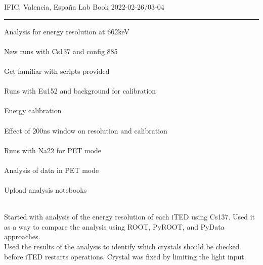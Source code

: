 \begin{center}
  {\Large IFIC, Valencia, España} \hfill {\Large Lab Book} \hfill {\Large 2022-02-26/03-04}\\
  \rule{\textwidth}{1pt}
\end{center}

\begin{minipage}[t][0.45\textheight][t]{0.97\linewidth}
  \begin{minipage}[t]{0.49\textwidth}
    \hspace{10pt}Analysis for energy resolution at 662keV\\~\\
    \hspace{10pt}New runs with Cs137 and config 885\\~\\
    \hspace{10pt}Get familiar with scripts provided\\~\\
    \hspace{10pt}Runs with Eu152 and background for calibration\\~\\
    \hspace{10pt}Energy calibration\\~\\
    \hspace{10pt}Effect of 200ns window on resolution and calibration\\~\\
    \hspace{10pt}Runs with Na22 for PET mode\\~\\
    \hspace{10pt}Analysis of data in PET mode\\~\\
    \hspace{10pt}Upload analysis notebooks\\~\\
  \end{minipage}
  \begin{minipage}[t]{0.49\textwidth}
    \begin{minipage}[t][0.22\textheight][t]{\textwidth}
        Started with analysis of the energy resolution of each iTED using Cs137. Used it as a way to compare the analysis using ROOT, PyROOT, and PyData approaches.\\Used the results of the analysis to identify which crystals should be checked before iTED restarts operations. Crystal was fixed by limiting the light input.\\~\\

\end{minipage}
\end{minipage}
\end{minipage}
